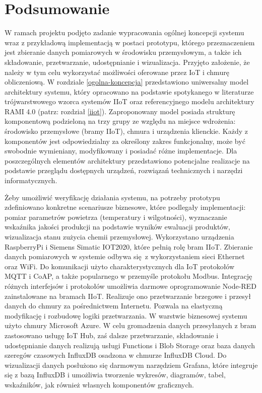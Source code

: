 \documentclass[a4paper, 12pt, twoside]{article}
\begin{document}
\section{Podsumowanie}\label{wnioski}

W ramach projektu podjęto zadanie wypracowania ogólnej koncepcji systemu
wraz z przykładową implementacją w postaci prototypu, którego przeznaczeniem jest
zbieranie danych pomiarowych w środowisku przemysłowym, a także ich składowanie, przetwarzanie,
udostępnianie i wizualizacja. Przyjęto założenie, że należy w tym celu wykorzystać możliwości
oferowane przez IoT i chmurę obliczeniową. W rozdziale \ref{ogolna-koncepcja}
przedstawiono uniwersalny model architektury systemu, który opracowano na podstawie
spotykanego w literaturze trójwarstwowego wzorca systemów IIoT oraz referencyjnego
modelu architektury RAMI 4.0 (patrz: rozdział \ref{iiot}). Zaproponowany model
posiada strukturę komponentową podzieloną na trzy grupy ze względu na miejsce wdrożenia:
środowisko przemysłowe (bramy IIoT), chmura i urządzenia klienckie. 
Każdy z komponentów jest odpowiedzialny za określony
zakres funkcjonalny, może być swobodnie wymieniany, modyfikowany i posiadać różne implementacje.
Dla poszczególnych elementów architektury przedstawiono potencjalne realizacje
na podstawie przeglądu dostępnych urządzeń, rozwiązań technicznych i  narzędzi informatycznych. 

Żeby umożliwić weryfikację działania systemu, 
na potrzeby prototypu zdefiniowano konkretne scenariusze biznesowe, które 
podlegały implementacji: pomiar parametrów powietrza (temperatury i wilgotności),
wyznaczanie wskaźnika jakości produkcji na podstawie wyników ewaluacji produktów, 
wizualizacja stanu zużycia chemii przemysłowej. Wykorzystano urządzenia
RaspberryPi i Siemens Simatic IOT2020, które pełnią rolę bram IIoT. Zbieranie
danych pomiarowych w systemie odbywa się z wykorzystaniem sieci Ethernet oraz WiFi.
Do komunikacji użyto charakterystycznych dla IoT protokołów MQTT i CoAP, a także
popularnego w przemyśle protokołu Modbus. Integrację różnych interfejsów i protokołów
umożliwia darmowe oprogramowanie Node-RED zainstalowane na bramach IIoT. 
Realizuje ono przetwarzanie brzegowe i przesył danych do chmury za pośrednictwem Internetu.
Pozwala na elastyczną modyfikację i rozbudowę logiki przetwarzania.
W warstwie biznesowej systemu użyto chmury Microsoft Azure. W celu 
gromadzenia danych przesyłanych z bram zastosowano usługę IoT Hub, zaś dalsze
przetwarzanie, składowanie i udostępnianie danych realizują usługi Functions i Blob Storage
oraz baza danych szeregów czasowych InfluxDB osadzona w chmurze InfluxDB Cloud. 
Do wizualizacji danych posłużono się darmowym narzędziem Grafana, które integruje się z bazą InfluxDB i
umożliwia tworzenie wykresów, diagramów, tabel, wskaźników, jak również własnych
komponentów graficznych.
\end{document}
